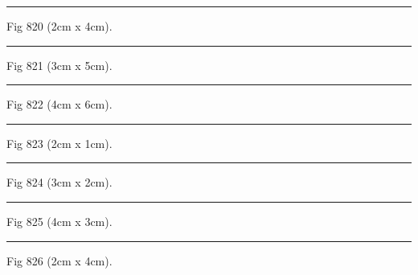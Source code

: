 \documentclass[a4paper,11pt]{article}
\begin{document}
\begin{swarmwrap}%
  \begin{minipage}[t]{2cm}
    \centering
    \rule{\linewidth}{4cm}
    {\footnotesize Fig 820 (2cm x 4cm).}
  \end{minipage}%
\end{swarmwrap}%
\swarmwrapnext
\lipsum[70]%

\begin{swarmwrap}%
  \begin{minipage}[t]{3cm}
    \centering
    \rule{\linewidth}{5cm}
    {\footnotesize Fig 821 (3cm x 5cm).}
  \end{minipage}%
\end{swarmwrap}%
\swarmwrapnext
\lipsum[71]%

\begin{swarmwrap}%
  \begin{minipage}[t]{4cm}
    \centering
    \rule{\linewidth}{6cm}
    {\footnotesize Fig 822 (4cm x 6cm).}
  \end{minipage}%
\end{swarmwrap}%
\swarmwrapnext
\lipsum[72]%

\begin{swarmwrap}%
  \begin{minipage}[t]{2cm}
    \centering
    \rule{\linewidth}{1cm}
    {\footnotesize Fig 823 (2cm x 1cm).}
  \end{minipage}%
\end{swarmwrap}%
\swarmwrapnext
\lipsum[73]%

\begin{swarmwrap}%
  \begin{minipage}[t]{3cm}
    \centering
    \rule{\linewidth}{2cm}
    {\footnotesize Fig 824 (3cm x 2cm).}
  \end{minipage}%
\end{swarmwrap}%
\swarmwrapnext
\lipsum[74]%

\begin{swarmwrap}%
  \begin{minipage}[t]{4cm}
    \centering
    \rule{\linewidth}{3cm}
    {\footnotesize Fig 825 (4cm x 3cm).}
  \end{minipage}%
\end{swarmwrap}%
\swarmwrapnext
\lipsum[75]%

\begin{swarmwrap}%
  \begin{minipage}[t]{2cm}
    \centering
    \rule{\linewidth}{4cm}
    {\footnotesize Fig 826 (2cm x 4cm).}
  \end{minipage}%
\end{swarmwrap}%
\swarmwrapnext
\lipsum[76]%
\end{document}
